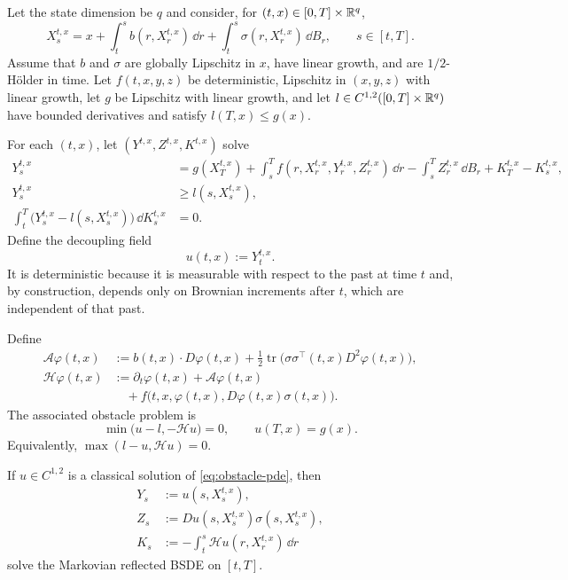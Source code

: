 Let the state dimension be $q$ and consider, for $(t,x)\in[0,T]\times\mathbb R^q$,
\begin{equation}
  X_s^{t,x}
  =x+\int_t^s b(r,X_r^{t,x})\,\dd r
      +\int_t^s\sigma(r,X_r^{t,x})\,\dd B_r,
  \qquad s\in[t,T]. \label{eq:forward-markov-sde}
\end{equation}
Assume that $b$ and $\sigma$ are globally Lipschitz in $x$, have linear
growth, and are $1/2$-H\"older in time. Let
$f(t,x,y,z)$ be deterministic, Lipschitz in $(x,y,z)$ with linear growth, let
$g$ be Lipschitz with linear growth, and let
$l\in C^{1,2}([0,T]\times\mathbb R^q)$ have bounded derivatives and satisfy
$l(T,x)\leq g(x)$.

For each $(t,x)$, let $(Y^{t,x},Z^{t,x},K^{t,x})$ solve
\begin{align}
  Y_s^{t,x}
  &=g(X_T^{t,x})
    +\int_s^T f(r,X_r^{t,x},Y_r^{t,x},Z_r^{t,x})\,\dd r
    -\int_s^T Z_r^{t,x}\,\dd B_r
    +K_T^{t,x}-K_s^{t,x}, \label{eq:markov-rbsde}\\
  Y_s^{t,x}&\geq l(s,X_s^{t,x}),\\
  \int_t^T\bigl(Y_s^{t,x}-l(s,X_s^{t,x})\bigr)\,\dd K_s^{t,x}&=0.
\end{align}
Define the decoupling field
\[
  u(t,x):=Y_t^{t,x}.
\]
It is deterministic because it is measurable with respect to the past at
time $t$ and, by construction, depends only on Brownian increments after
$t$, which are independent of that past.

Define
\begin{align}
  \mathcal A\varphi(t,x)
  &:=b(t,x)\cdot D\varphi(t,x)
    +\frac12\operatorname{tr}
      \bigl(\sigma\sigma^\top(t,x)D^2\varphi(t,x)\bigr),\\
  \mathcal H\varphi(t,x)
  &:=\partial_t\varphi(t,x)+\mathcal A\varphi(t,x)\\
  &\quad+f\bigl(t,x,\varphi(t,x),D\varphi(t,x)\sigma(t,x)\bigr).
\end{align}
The associated obstacle problem is
\begin{equation}
  \min\bigl(u-l,-\mathcal H u\bigr)=0,
  \qquad
  u(T,x)=g(x). \label{eq:obstacle-pde}
\end{equation}
Equivalently, $\max(l-u,\mathcal H u)=0$.

\begin{theorem}
If $u\in C^{1,2}$ is a classical solution of \eqref{eq:obstacle-pde}, then
\begin{align*}
  Y_s&:=u(s,X_s^{t,x}),\\
  Z_s&:=Du(s,X_s^{t,x})\sigma(s,X_s^{t,x}),\\
  K_s&:=-\int_t^s\mathcal H u(r,X_r^{t,x})\,\dd r
\end{align*}
solve the Markovian reflected BSDE on $[t,T]$.
\end{theorem}

